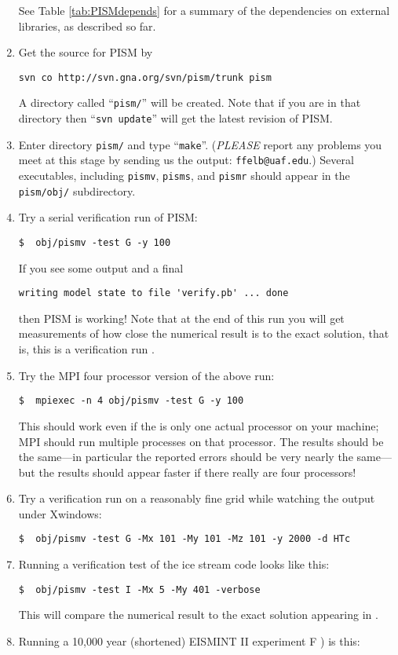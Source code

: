 \documentclass[11pt,final]{amsart}
\begin{document}
\begin{enumerate}
See Table \ref{tab:PISMdepends} for a summary of the dependencies on external libraries, as described so far.

\item \label{getPISMstep} Get the source for PISM by

\verb|svn co http://svn.gna.org/svn/pism/trunk pism|

\noindent A directory called ``\verb|pism/|'' will be created.  Note that if you are in that directory then ``\verb|svn update|'' will get the latest revision of PISM.
\item Enter directory \verb|pism/| and type ``\verb|make|''.  (\emph{PLEASE} report any problems you meet at this stage by sending us the output: \verb|ffelb@uaf.edu|.)  Several executables, including \verb|pismv|, \verb|pisms|, and \verb|pismr| should appear in the \verb|pism/obj/| subdirectory.
\item Try a serial verification run of PISM:

\verb|$  obj/pismv -test G -y 100|

\noindent If you see some output and a final 

\verb|writing model state to file 'verify.pb' ... done|

\noindent then PISM is working!  Note that at the end of this run you will get measurements of how close the numerical result is to the exact solution, that is, this is a verification run \cite{BBL}.
\item Try the MPI four processor version of the above run:

\verb|$  mpiexec -n 4 obj/pismv -test G -y 100|

\noindent This should work even if the is only one actual processor on your machine; MPI should run multiple processes on that processor.  The results should be the same---in particular the reported errors should be very nearly the same---but the results should appear faster if there really are four processors!
\item Try a verification run on a reasonably fine grid while watching the output under Xwindows:

\verb|$  obj/pismv -test G -Mx 101 -My 101 -Mz 101 -y 2000 -d HTc|
\item Running a verification test of the ice stream code looks like this:

\verb|$  obj/pismv -test I -Mx 5 -My 401 -verbose|

\noindent This will compare the numerical result to the exact solution appearing in \cite{SchoofStream}.
\item Running a 10,000 year (shortened) EISMINT II experiment F \cite{EISMINT00}) is this:


\end{enumerate}
\end{document}
